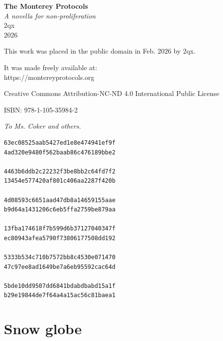 \documentclass[17pt, twoside, a5paper, openright, extrafontsizes]{memoir}
\begin{document}
\frontmatter
\thispagestyle{empty}
\null\newpage
\thispagestyle{empty}
\null\newpage

\thispagestyle{empty}
\begin{center}
\vspace*{2in}
{\Huge\bfseries The Monterey Protocols}\\[1em]
{\Large\itshape A novella for non-proliferation}\\[3em]
{\Large 2qx}\\[1em]
\vfill
{\large 2026}
\end{center}
\newpage

\thispagestyle{empty}
\vspace*{\fill}
\noindent
This work was placed in the public domain in Feb. 2026 by 2qx.

It was made freely available at:\\
https://montereyprotocols.org

Creative Commons Attribution-NC-ND 4.0
International Public License

ISBN: 978-1-105-35984-2

\newpage

\thispagestyle{empty}
\vspace*{\fill}
\begin{center}
\textit{To Ms. Coker and others.}
\end{center}
\vspace*{\fill}
\newpage


\begin{verbatim}
63ec08525aab5427ed1e8e474941ef9f
4ad320e9480f562baab86c476189bbe2

4463b6ddb2c22232f3be8bb2c64fd7f2
13454e577420af801c406aa2287f420b

4d08593c6651aad47db8a14659155aae
b9d64a1431206c6eb5ffa2759be879aa

13fba174618f7b599d6b37127040347f
ec80943afea5790f73806177508dd192

5333b534c710b7572bb8c4530e071470
47c97ee8ad1649be7a6eb95592cac64d

5bde10dd9507dd6841bdabdbabd15a1f
b29e19844de7f64a4a15ac56c81baea1
\end{verbatim}
\newpage

\tableofcontents*

\mainmatter


\chapter{Snow globe}
\end{document}
